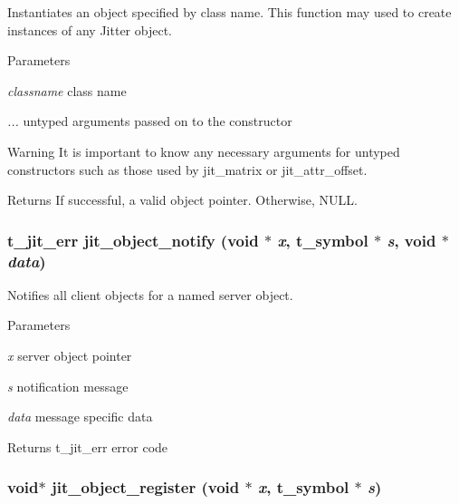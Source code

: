 Instantiates an object specified by class name. This function may used to create instances of any Jitter object.


\begin{DoxyParams}{Parameters}
\item[{\em classname}]class name \item[{\em ...}]untyped arguments passed on to the constructor \end{DoxyParams}
\begin{DoxyWarning}{Warning}
It is important to know any necessary arguments for untyped constructors such as those used by jit\_\-matrix or jit\_\-attr\_\-offset.
\end{DoxyWarning}
\begin{DoxyReturn}{Returns}
If successful, a valid object pointer. Otherwise, NULL. 
\end{DoxyReturn}
\hypertarget{group__objectmod_ga4bbd50b2d1e34de44d36e1a66a477b9f}{
\subsubsection[{jit\_\-object\_\-notify}]{\setlength{\rightskip}{0pt plus 5cm}t\_\-jit\_\-err jit\_\-object\_\-notify (void $\ast$ {\em x}, \/  {\bf t\_\-symbol} $\ast$ {\em s}, \/  void $\ast$ {\em data})}}
\label{group__objectmod_ga4bbd50b2d1e34de44d36e1a66a477b9f}


Notifies all client objects for a named server object. 
\begin{DoxyParams}{Parameters}
\item[{\em x}]server object pointer \item[{\em s}]notification message \item[{\em data}]message specific data\end{DoxyParams}
\begin{DoxyReturn}{Returns}
t\_\-jit\_\-err error code 
\end{DoxyReturn}
\hypertarget{group__objectmod_gabcf088a00f36b6af8ce5896b81e4d0ef}{
\subsubsection[{jit\_\-object\_\-register}]{\setlength{\rightskip}{0pt plus 5cm}void$\ast$ jit\_\-object\_\-register (void $\ast$ {\em x}, \/  {\bf t\_\-symbol} $\ast$ {\em s})}}
\label{group__objectmod_gabcf088a00f36b6af8ce5896b81e4d0ef}


